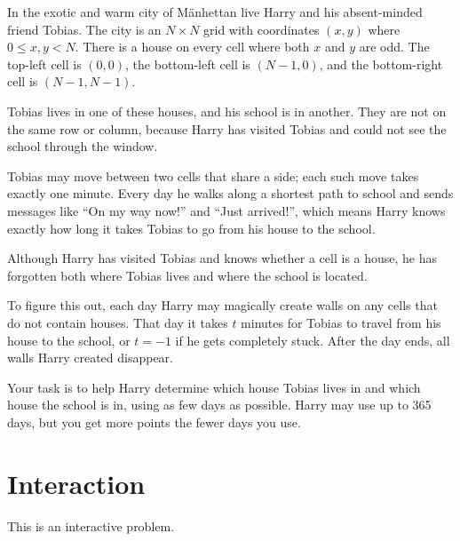 
In the exotic and warm city of Mänhettan live Harry and his absent-minded friend Tobias.
The city is an $N \times N$ grid with coordinates $(x,y)$ where $0 \le x,y < N$. There is a house on every cell where both $x$ and $y$ are odd.
The top-left cell is $(0,0)$, the bottom-left cell is $(N-1,0)$, and the bottom-right cell is $(N-1,N-1)$.

Tobias lives in one of these houses, and his school is in another.
They are not on the same row or column, because Harry has visited Tobias and could not see the school through the window.

Tobias may move between two cells that share a side; each such move takes exactly one minute. Every day he walks along a shortest path to school and sends messages like ``On my way now!'' and ``Just arrived!'', which means Harry knows exactly how long it takes Tobias to go from his house to the school.

Although Harry has visited Tobias and knows whether a cell is a house, he has forgotten both where Tobias lives and where the school is located.

To figure this out, each day Harry may magically create walls on any cells that do not contain houses.
That day it takes $t$ minutes for Tobias to travel from his house to the school, or $t=-1$ if he gets completely stuck. After the day ends, all walls Harry created disappear.

Your task is to help Harry determine which house Tobias lives in and which house the school is in, using as few days as possible.
Harry may use up to 365 days, but you get more points the fewer days you use.

\section*{Interaction}
This is an interactive problem.


